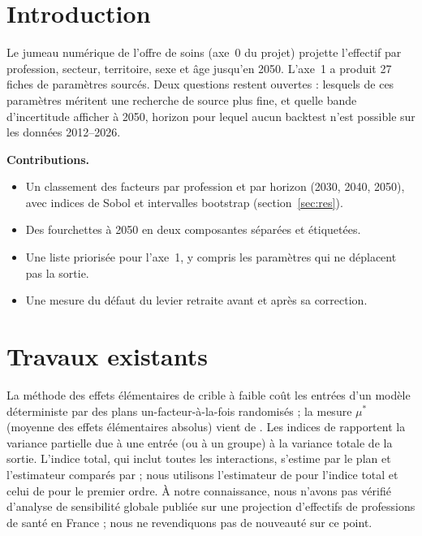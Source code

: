 \documentclass[11pt]{article}
\begin{document}
\section{Introduction}
Le jumeau numérique de l'offre de soins (axe~0 du projet) projette l'effectif par profession, secteur, territoire,
sexe et âge jusqu'en 2050. L'axe~1 a produit 27 fiches de paramètres sourcés. Deux questions restent ouvertes :
lesquels de ces paramètres méritent une recherche de source plus fine, et quelle bande d'incertitude afficher à
2050, horizon pour lequel aucun backtest n'est possible sur les données 2012--2026.

\textbf{Contributions.}
\begin{itemize}
  \item Un classement des facteurs par profession et par horizon (2030, 2040, 2050), avec indices de Sobol et
        intervalles bootstrap (section~\ref{sec:res}).
  \item Des fourchettes à 2050 en deux composantes séparées et étiquetées.
  \item Une liste priorisée pour l'axe~1, y compris les paramètres qui ne déplacent pas la sortie.
  \item Une mesure du défaut du levier retraite avant et après sa correction.
\end{itemize}

\section{Travaux existants}
La méthode des effets élémentaires de \citet{morris1991} crible à faible coût les entrées d'un modèle déterministe
par des plans un-facteur-à-la-fois randomisés ; la mesure $\mu^*$ (moyenne des effets élémentaires absolus) vient
de \citet{campolongo2007}. Les indices de \citet{sobol2001} rapportent la variance partielle
due à une entrée (ou à un groupe) à la variance totale de la sortie. L'indice total, qui inclut toutes les
interactions, s'estime par le plan et l'estimateur comparés par \citet{saltelli2010} ; nous utilisons l'estimateur
de \citet{jansen1999} pour l'indice total et celui de \citet{saltelli2010} pour le premier ordre. À notre
connaissance, nous n'avons pas vérifié d'analyse de sensibilité globale publiée sur une projection d'effectifs de
professions de santé en France ; nous ne revendiquons pas de nouveauté sur ce point.
\end{document}
